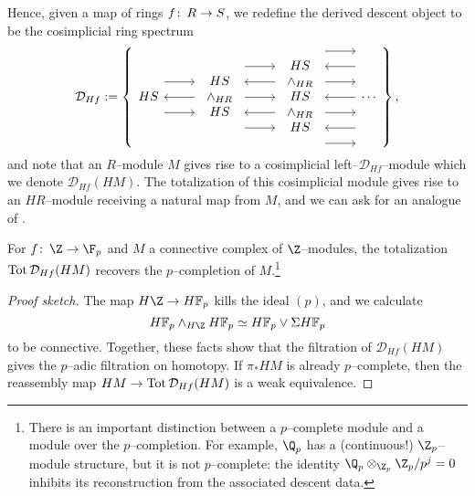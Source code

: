 Hence, given a map of rings \(f\colon\thinspace R \to S\), we redefine the derived descent object to be the cosimplicial ring spectrum
\[\mathcal D_{Hf} := \left\{
\begin{tikzcd}[ampersand replacement=\&]
HS \arrow[leftarrow]{r} \arrow[shift left=\baselineskip]{r} \arrow[shift right=\baselineskip]{r} \&
\begin{array}{c} HS \\ \sm_{HR} \\ HS \end{array} \arrow[shift left=(2*\baselineskip)]{r} \arrow[leftarrow, shift left=\baselineskip]{r} \arrow{r} \arrow[leftarrow, shift right=\baselineskip]{r} \arrow[shift right=(2*\baselineskip)]{r} \&
\begin{array}{c} HS \\ \sm_{HR} \\ HS \\ \sm_{HR} \\ HS \end{array} \arrow[shift left=(3*\baselineskip)]{r} \arrow[leftarrow, shift left=(2*\baselineskip)]{r} \arrow[shift left=\baselineskip]{r} \arrow[leftarrow]{r} \arrow[shift right=\baselineskip]{r} \arrow[leftarrow, shift right=(2*\baselineskip)]{r} \arrow[shift right=(3*\baselineskip)]{r} \&
\cdots
\end{tikzcd}
\right\},\]
and note that an \(R\)--module \(M\) gives rise to a cosimplicial left--\(\mathcal D_{Hf}\)--module which we denote \(\mathcal D_{Hf}(HM)\).  The totalization of this cosimplicial module gives rise to an \(HR\)--module receiving a natural map from \(M\), and we can ask for an analogue of .

\begin{lemma}\label{DescentFromHFpToHZp}
For \(f\co \Z \to \F_p\) and \(M\) a connective complex of \(\Z\)--modules, the totalization \(\operatorname{Tot} \mathcal D_{Hf}(HM)\) recovers the \(p\)--completion of \(M\).\footnote{There is an important distinction between a \(p\)--complete module and a module over the \(p\)--completion.  For example, \(\Q_p\) has a (continuous!) \(\Z_p\)--module structure, but it is not \(p\)--complete: the identity \(\Q_p \otimes_{\Z_p} \Z_p / p^j = 0\) inhibits its reconstruction from the associated descent data.}
\end{lemma}
\begin{proof}[Proof sketch]
The map \(H\Z \to \HFp\) kills the ideal \((p)\), and we calculate \[\HFp \sm_{H\Z} \HFp \simeq \HFp \vee \Susp \HFp\] to be connective.  Together, these facts show that the filtration of \(\mathcal D_{Hf}(HM)\) gives the \(p\)--adic filtration on homotopy.  If \(\pi_* HM\) is already \(p\)--complete, then the reassembly map \(HM \to \operatorname{Tot} \mathcal D_{Hf}(HM)\) is a weak equivalence.
\end{proof}


